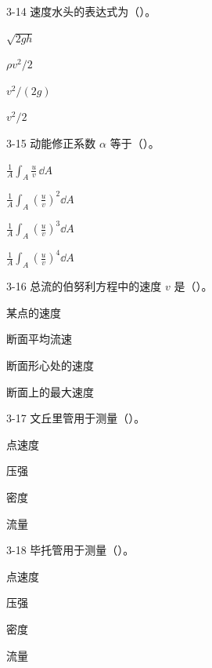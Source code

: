 \begin{ti}
\item[3-14] 速度水头的表达式为（\quad）。
\begin{choices}
\item $\sqrt{2gh}$
\item $\rho v^2/2$
\item $v^2/(2g)$
\item $v^2/2$
\end{choices}

\item[3-15] 动能修正系数 $\alpha$ 等于（\quad）。
\begin{choices}
\item $\displaystyle\frac{1}{A}\int_A\frac{u}{v}\,\dd A$
\item $\displaystyle\frac{1}{A}\int_A\left(\frac{u}{v}\right)^2\dd A$
\item $\displaystyle\frac{1}{A}\int_A\left(\frac{u}{v}\right)^3\dd A$
\item $\displaystyle\frac{1}{A}\int_A\left(\frac{u}{v}\right)^4\dd A$
\end{choices}

\item[3-16] 总流的伯努利方程中的速度 $v$ 是（\quad）。
\begin{choices}
\item 某点的速度
\item 断面平均流速
\item 断面形心处的速度
\item 断面上的最大速度
\end{choices}

\item[3-17] 文丘里管用于测量（\quad）。
\begin{choices}
\item 点速度
\item 压强
\item 密度
\item 流量
\end{choices}

\item[3-18] 毕托管用于测量（\quad）。
\begin{choices}
\item 点速度
\item 压强
\item 密度
\item 流量
\end{choices}


\end{ti}
